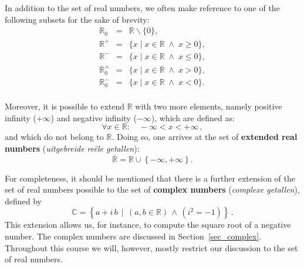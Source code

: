 In addition to the set of real numbers, we often make reference to one of the following subsets for the sake of brevity:
\begin{eqnarray*}
	\mathbb{R}_0 &=& \mathbb{R} \backslash \{0\},\\
	\mathbb{R}^+ &=& \{x\; |\; x\in \mathbb{R} \;\wedge\; x \geq 0\},\\
	\mathbb{R}^- &=& \{x\; |\; x\in \mathbb{R} \;\wedge\; x \leq 0\},\\
	\mathbb{R}^+_0 &=& \{ x\; |\; x\in \mathbb{R}\;\wedge\; x > 0 \},\\
	\mathbb{R}^-_0 &=& \{ x\; |\; x\in \mathbb{R}\;\wedge\; x < 0 \}.\\
\end{eqnarray*}

Moreover, it is possible to extend $\mathbb{R}$ with two more elements, namely positive infinity ($+\infty$) and negative infinity  ($-\infty$), which are defined as:
$$ 
\forall x\in\mathbb{R}:\quad-\infty<x<+\infty\,,
$$
and which do not belong to $\mathbb{R}$. Doing so, one arrives at the set of \textbf{extended real numbers} (\textit{uitgebreide re\"ele getallen}):
$$
\overline{\mathbb{R}}=\mathbb{R}\cup\left\{-\infty,+\infty\right\}.
$$


For completeness, it should be mentioned that there is a further extension of the set of real numbers possible to the set of \textbf{complex numbers} (\textit{complexe getallen}), defined by 
$$\mathbb C=\left\{a+i\,b \, \mid \, \left(a,b  \in \mathbb R\right) \, \wedge \, \left(i^2=-1\right) \right\}\,.$$
This extension allows us, for instance, to compute the square root of a negative number. The complex numbers are discussed in Section~\ref{sec_complex}. Throughout this course we will, however, mostly restrict our discussion to the set of real numbers. 

